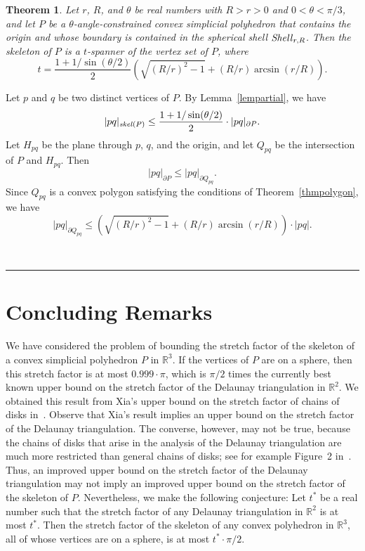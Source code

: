 \documentclass[12pt]{article}
\newtheorem{theorem}{Theorem}
\newcommand{\IR}{\mathbb{R}}
\newcommand{\skel}{\mathord{\it skel}}
\newcommand{\Shell}{\mathord{\it Shell}}
\newcommand{\qed}{\rule{0.5em}{1.5ex}}
\newcommand{\fqed}{{\hfill~\qed}}
\newenvironment{proof}{{\noindent \bf Proof.}}
                      {{\hfill \fqed} \vspace{1em}}
\begin{document}
\begin{theorem} 
Let $r$, $R$, and $\theta$ be real numbers with $R>r>0$ and 
$0 < \theta < \pi/3$, and let $P$ be a $\theta$-angle-constrained 
convex simplicial polyhedron that contains the origin and whose boundary 
is contained in the spherical shell $\Shell_{r,R}$. Then the skeleton of 
$P$ is a $t$-spanner of the vertex set of $P$, where  
\[ t = \frac{1+1/\sin(\theta/2)}{2} 
       \left( \sqrt{(R/r)^2-1} + (R/r) \arcsin(r/R) \right) . 
\] 
\end{theorem} 
\begin{proof}  
Let $p$ and $q$ be two distinct vertices of $P$. 
By Lemma~\ref{lempartial}, we have 
\[ |pq|_{\skel(P)} \leq 
           \frac{1+1/\sin(\theta/2)}{2} \cdot |pq|_{\partial P} .  
\]
Let $H_{pq}$ be the plane through $p$, $q$, and the origin, and let 
$Q_{pq}$ be the intersection of $P$ and $H_{pq}$. Then 
\[ |pq|_{\partial P} \leq |pq|_{\partial Q_{pq}} . 
\]  
Since $Q_{pq}$ is a convex polygon satisfying the conditions of 
Theorem~\ref{thmpolygon}, we have 
\[ |pq|_{\partial Q_{pq}} \leq 
        \left( \sqrt{(R/r)^2-1} + (R/r) \arcsin(r/R) \right) \cdot |pq| . 
\] 
\end{proof} 

\section{Concluding Remarks} 
We have considered the problem of bounding the stretch factor of the 
skeleton of a convex simplicial polyhedron $P$ in $\IR^3$. If the 
vertices of $P$ are on a sphere, then this stretch factor is at 
most $0.999 \cdot \pi$, which is $\pi/2$ times the currently best known 
upper bound on the stretch factor of the Delaunay triangulation in 
$\IR^2$. We obtained this result from Xia's upper bound on the stretch 
factor of chains of disks in~\cite{x-sfdtl-13}. Observe that Xia's 
result implies an upper bound on the stretch factor of the Delaunay 
triangulation. The converse, however, may not be true, because the 
chains of disks that arise in the analysis of the Delaunay triangulation 
are much more restricted than general chains of disks; see for example 
Figure~2 in~\cite{x-sfdtl-13}. Thus, an improved upper bound on the 
stretch factor of the Delaunay triangulation may not imply an improved 
upper bound on the stretch factor of the skeleton of $P$. Nevertheless, 
we make the following conjecture: Let $t^*$ be a real number such that 
the stretch factor of any Delaunay triangulation in $\IR^2$ is at most 
$t^*$. Then the stretch factor of the skeleton of any convex polyhedron 
in $\IR^3$, all of whose vertices are on a sphere, is at most 
$t^* \cdot \pi/2$. 
 
\end{document}
